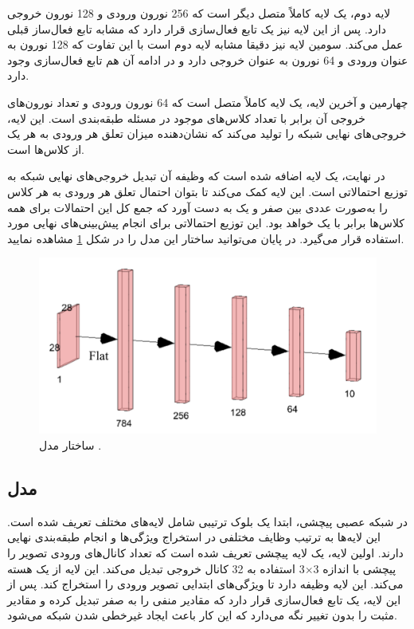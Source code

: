 لایه دوم، یک لایه کاملاً متصل دیگر است که 256 نورون ورودی و 128 نورون خروجی دارد. پس از این لایه نیز یک تابع فعال‌سازی
قرار دارد که مشابه تابع فعال‌ساز قبلی عمل می‌کند. سومین لایه نیز دقیقا مشابه لایه دوم است با این تفاوت که 128 نورون به عنوان ورودی و 64 نورون به عنوان خروجی دارد و در ادامه آن هم تابع فعال‌سازی
وجود دارد.

چهارمین و آخرین لایه، یک لایه کاملاً متصل است که 64 نورون ورودی و تعداد نورون‌های خروجی آن برابر با تعداد کلاس‌های موجود در مسئله طبقه‌بندی است. این لایه، خروجی‌های نهایی شبکه را تولید می‌کند که نشان‌دهنده میزان تعلق هر ورودی به هر یک از کلاس‌ها است.

در نهایت، یک لایه 
اضافه شده است که وظیفه آن تبدیل خروجی‌های نهایی شبکه به توزیع احتمالاتی است. این لایه کمک می‌کند تا بتوان احتمال تعلق هر ورودی به هر کلاس را به‌صورت عددی بین صفر و یک به دست آورد که جمع کل این احتمالات برای همه کلاس‌ها برابر با یک خواهد بود. این توزیع احتمالاتی برای انجام پیش‌بینی‌های نهایی مورد استفاده قرار می‌گیرد. در پایان می‌توانید ساختار این مدل را در شکل
\ref{mlp}
مشاهده نمایید.

\begin{figure}[t!]
	\centering
	\includegraphics[scale=0.7]{images/chap5/mlp.png}%
	\caption{
		ساختار مدل 
		.
	}
	\label{mlp}
	\centering
\end{figure}



\subsection{
	مدل
}
در شبکه عصبی پیچشی، ابتدا یک بلوک ترتیبی شامل لایه‌های مختلف تعریف شده است. این لایه‌ها به ترتیب وظایف مختلفی در استخراج ویژگی‌ها و انجام طبقه‌بندی نهایی دارند.
اولین لایه، یک لایه پیچشی تعریف شده است که تعداد کانال‌های ورودی تصویر را به 32 کانال خروجی تبدیل می‌کند. این لایه از یک هسته ‎پیچشی با اندازه
3$\times$3
استفاده می‌کند. این لایه وظیفه دارد تا ویژگی‌های ابتدایی تصویر ورودی را استخراج کند. پس از این لایه، یک تابع فعال‌سازی 
قرار دارد که مقادیر منفی را به صفر تبدیل کرده و مقادیر مثبت را بدون تغییر نگه می‌دارد که این کار باعث ایجاد غیرخطی‌ شدن شبکه می‌شود.

